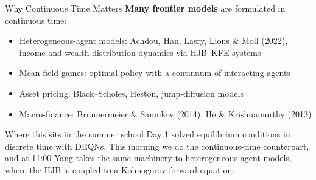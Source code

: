 \documentclass[aspectratio=169,11pt]{beamer}
\newcommand{\emphc}[1]{\textcolor{harvardcrimson}{#1}}
\begin{document}
\begin{frame}{Why Continuous Time Matters}
\textbf{Many frontier models} are formulated in continuous time:

\vspace{0.3em}
\begin{itemize}
    \item \emphc{Heterogeneous-agent models:} Achdou, Han, Lasry, Lions \& Moll (2022), income and wealth distribution dynamics via HJB--KFE systems

    \vspace{0.2em}
    \item \emphc{Mean-field games:} optimal policy with a continuum of interacting agents

    \vspace{0.2em}
    \item \emphc{Asset pricing:} Black--Scholes, Heston, jump-diffusion models

    \vspace{0.2em}
    \item \emphc{Macro-finance:} Brunnermeier \& Sannikov (2014), He \& Krishnamurthy (2013)
\end{itemize}

\vspace{0.4em}
\begin{block}{Where this sits in the summer school}
Day 1 solved equilibrium conditions in \emphc{discrete} time with DEQNs. This morning we do the \emphc{continuous-time} counterpart, and at 11:00 Yang takes the same machinery to heterogeneous-agent models, where the HJB is coupled to a Kolmogorov forward equation.
\end{block}
\end{frame}
\end{document}

